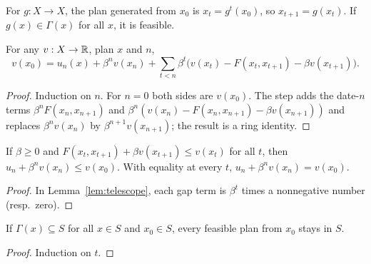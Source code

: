 \begin{definition}
\label{def:planOf}
\leanok
{}
For $g : X \to X$, the plan generated from $x_0$ is $x_t = g^t(x_0)$, so $x_{t+1} = g(x_t)$. If
$g(x) \in \Gamma(x)$ for all $x$, it is feasible.
\end{definition}

\begin{lemma}
\label{lem:telescope}
\leanok
{}
For any $v : X \to \mathbb{R}$, plan $x$ and $n$,
\[
  v(x_0) = u_n(x) + \beta^n v(x_n) + \sum_{t < n} \beta^t \big(v(x_t) - F(x_t, x_{t+1}) - \beta v(x_{t+1})\big).
\]
\end{lemma}
\begin{proof}
\leanok
Induction on $n$. For $n = 0$ both sides are $v(x_0)$. The step adds the date-$n$ terms
$\beta^n F(x_n, x_{n+1})$ and $\beta^n(v(x_n) - F(x_n, x_{n+1}) - \beta v(x_{n+1}))$ and replaces
$\beta^n v(x_n)$ by $\beta^{n+1} v(x_{n+1})$; the result is a ring identity.
\end{proof}

\begin{lemma}
\label{lem:partialPayoff_bellman}
\leanok
{}
If $\beta \ge 0$ and $F(x_t, x_{t+1}) + \beta v(x_{t+1}) \le v(x_t)$ for all $t$, then
$u_n + \beta^n v(x_n) \le v(x_0)$. With equality at every $t$, $u_n + \beta^n v(x_n) = v(x_0)$.
\end{lemma}
\begin{proof}
\leanok
In Lemma~\ref{lem:telescope}, each gap term is $\beta^t$ times a nonnegative number (resp.\ zero).
\end{proof}

\begin{lemma}
\label{lem:feasible_mem}
\leanok
{}
If $\Gamma(x) \subseteq S$ for all $x \in S$ and $x_0 \in S$, every feasible plan from $x_0$ stays in $S$.
\end{lemma}
\begin{proof}
\leanok
Induction on $t$.
\end{proof}

